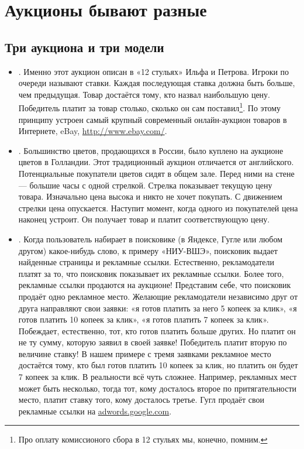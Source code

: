 \chapter{Аукционы бывают разные}




\section{Три аукциона и три модели}

\begin{itemize}

\item {}. Именно этот аукцион описан в «12 стульях» Ильфа и Петрова. Игроки по очереди называют ставки. Каждая последующая ставка должна быть больше, чем предыдущая. Товар достаётся тому, кто назвал наибольшую цену. Победитель платит за товар столько, сколько он сам поставил\footnote{Про оплату комиссионого сбора в 12 стульях мы, конечно, помним.}. По этому принципу устроен самый крупный современный онлайн-аукцион товаров в Интернете, eBay, \url{http://www.ebay.com/}.

\item {}. Большинство цветов, продающихся в России, было куплено на аукционе цветов в Голландии. Этот традиционный аукцион отличается от английского. Потенциальные покупатели цветов сидят в общем зале. Перед ними на стене — большие часы с одной стрелкой. Стрелка показывает текущую цену товара. Изначально цена высока и никто не хочет покупать. С движением стрелки цена опускается. Наступит момент, когда одного из покупателей цена наконец устроит. Он получает товар и платит соответствующую цену.

\item {}. Когда пользователь набирает в поисковике (в Яндексе, Гугле или любом другом) какое-нибудь слово, к примеру «НИУ-ВШЭ», поисковик выдает найденные страницы и рекламные ссылки. Естественно, рекламодатели платят за то, что поисковик показывает их рекламные ссылки. Более того, рекламные ссылки продаются на аукционе! Представим себе, что поисковик продаёт одно рекламное место. Желающие рекламодатели независимо друг от друга направляют свои заявки: «я готов платить за него 5 копеек за клик», «я готов платить 10 копеек за клик», «я готов платить 7 копеек за клик». Побеждает, естественно, тот, кто готов платить больше других. Но платит он не ту сумму, которую заявил в своей заявке! Победитель платит вторую по величине ставку! В нашем примере с тремя заявками рекламное место достаётся тому, кто был готов платить 10 копеек за клик, но платить он будет 7 копеек за клик. В реальности всё чуть сложнее. Например, рекламных мест может быть несколько, тогда тот, кому досталось второе по притягательности место, платит ставку того, кому досталось третье. Гугл продаёт свои рекламные ссылки на \url{adwords.google.com}.


\end{itemize}
